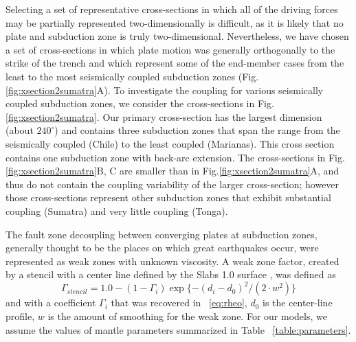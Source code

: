 \documentclass[12pt]{article}
\begin{document}
Selecting a set of representative cross-sections in which all of the driving forces may be partially represented two-dimensionally is difficult, as it is likely that no plate and subduction zone is truly two-dimensional. 
Nevertheless, we have chosen a set of cross-sections in which plate motion was generally orthogonally to the strike of the trench and which represent some of the end-member cases from the least to the most seismically coupled subduction zones (Fig.\ref{fig:xsection2sumatra}A). To investigate the coupling for various seismically coupled subduction zones, we consider the cross-sections in Fig. \ref{fig:xsection2sumatra}. 
Our primary cross-section has the largest dimension (about $240^{\circ}$) and contains three subduction zones that span the range from the seismically coupled (Chile) to the least coupled (Marianas). This cross section contains one subduction zone with back-arc extension. The cross-sections in Fig.\ref{fig:xsection2sumatra}B, C are smaller than in  Fig.\ref{fig:xsection2sumatra}A, and thus do not contain the coupling variability of the larger cross-section; however those cross-sections represent other subduction zones that exhibit substantial coupling (Sumatra) and very little coupling (Tonga).




The fault zone decoupling between converging plates at subduction zones, generally thought to be the places on which great earthquakes occur, were represented as weak zones with unknown viscosity. 
A weak zone factor, created by a stencil with a center line defined by the Slabs 1.0 surface \citep{Hayes2012}, was defined as
\begin{equation}
\Gamma_{stencil} = 1.0 - (1-\Gamma_i)\exp\{-(d_i-d_0)^2/(2\cdot w^2)\}
\end{equation}
and with a coefficient $\Gamma_i$ that was recovered in ~\eqref{eq:rheo}, $d_0$ is the center-line profile, $w$ is the amount of smoothing for the weak zone.
 For our models, we assume the values of mantle parameters summarized in Table ~\ref{table:parameters}.
\end{document}
